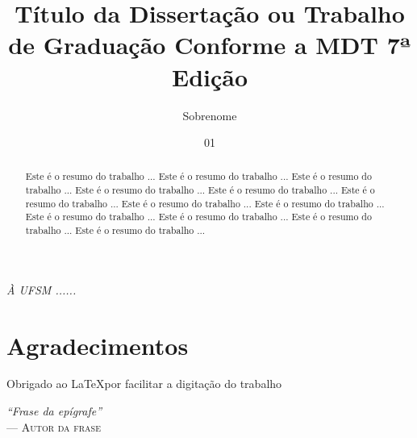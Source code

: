 \documentclass[diss]{mdtufsm}
\title{Título da Dissertação ou Trabalho de Graduação Conforme a MDT 7ª Edição}
\author{Sobrenome}{Nome Autor}
\institute{Centro de Tecnologia}
\date{01}{Março}{2011}
\begin{document}
\maketitle

\restoregeometry


\makeapprove

\clearpage
\begin{flushright}
\mbox{}\vfill
{\sffamily\itshape À UFSM ......}
\end{flushright}

\chapter*{Agradecimentos}
Obrigado ao \LaTeX por facilitar a digitação do trabalho


\clearpage
\begin{flushright}
\mbox{}\vfill
{\sffamily\itshape
``Frase da epígrafe'' \\ }
--- \textsc{Autor da frase}
\end{flushright}


\begin{abstract}
Este é o resumo do trabalho ... Este é o resumo do trabalho ...
Este é o resumo do trabalho ... Este é o resumo do trabalho ...
Este é o resumo do trabalho ... Este é o resumo do trabalho ...
Este é o resumo do trabalho ... Este é o resumo do trabalho ...
Este é o resumo do trabalho ... Este é o resumo do trabalho ...
Este é o resumo do trabalho ... Este é o resumo do trabalho ...
\end{abstract}
\end{document}
